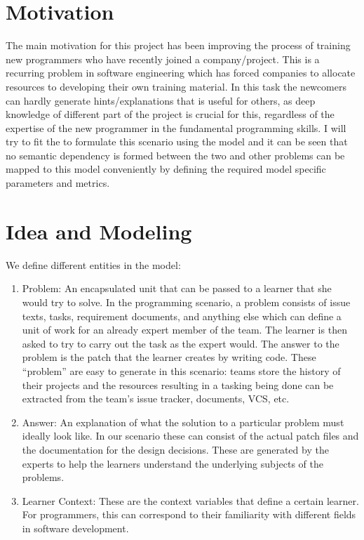 \documentclass[conference]{IEEEtran}
\begin{document}
	\section{Motivation}
	The main motivation for this project has been improving the process of training new programmers who have
	recently joined a company/project. This is a recurring problem in software engineering which has forced
	companies to allocate resources to developing their own training material. In this task the newcomers can
	hardly generate hints/explanations that is useful for others, as deep knowledge of different part of the
	project is crucial for this, regardless of the expertise of the new programmer in the fundamental
	programming skills. I will try to fit the to formulate this scenario using the model and it can be
	seen that no semantic dependency is formed between the two and other problems can be mapped to this 
	model conveniently by defining the required model specific parameters and metrics.
		
	\section{Idea and Modeling}
	
	We define different entities in the model:\\
	\begin{enumerate}
		\item Problem: An encapsulated unit that can be passed to a learner that she would try to solve. In the
		programming scenario, a problem consists of issue texts, tasks, requirement documents, and anything else
		which can define a unit of work for an already expert member of the team. The learner is then asked to
		try to carry out the task as the expert would. The answer to the problem is the patch that the learner
		creates by writing code. These ``problem'' are easy to generate in this scenario: teams store the
		history of their projects and the resources resulting in a tasking being done can be extracted from the
		team's issue tracker, documents, VCS, etc.
		
		\item Answer: An explanation of what the solution to a particular problem must ideally look like. In our
		scenario these can consist of the actual patch files and the documentation for the design decisions.
		These are generated by the experts to help the learners understand the underlying subjects of the problems.
		
		\item Learner Context: These are the context variables that define a certain learner. For programmers, this
		can correspond to their familiarity with different fields in software development.\\
	\end{enumerate}
\end{document}
